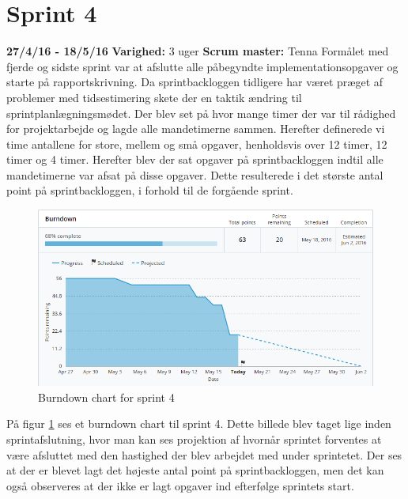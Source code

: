 	\section{Sprint 4}
	\textbf{27/4/16 - 18/5/16}\newline
	\textbf{Varighed: }3 uger \newline
	\textbf{Scrum master: }Tenna \newline \newline
	Formålet med fjerde og sidste sprint var at afslutte alle påbegyndte implementationsopgaver og starte på rapportskrivning. Da sprintbackloggen tidligere har været præget af problemer med tidsestimering skete der en taktik ændring til sprintplanlægningsmødet. Der blev set på hvor mange timer der var til rådighed for projektarbejde og lagde alle mandetimerne sammen. Herefter definerede vi time antallene for store, mellem og små opgaver, henholdsvis over 12 timer, 12 timer og 4 timer. Herefter blev der sat opgaver på sprintbackloggen indtil alle mandetimerne var afsat på disse opgaver. Dette resulterede i det største antal point på sprintbackloggen, i forhold til de forgående sprint.

	\begin{figure}[H]
		\centering
		\includegraphics[width=\textwidth]{Projektgennemfoerelse/images/burndown4}
		\caption{Burndown chart for sprint 4}
		\label{ref:Burndown4}
	\end{figure}
	
	På figur \ref{ref:Burndown4} ses et burndown chart til sprint 4. Dette billede blev taget lige inden sprintafslutning, hvor man kan ses projektion af hvornår sprintet forventes at være afsluttet med den hastighed der blev arbejdet med under sprintetet. Der ses at der er blevet lagt det højeste antal point på sprintbackloggen, men det kan også observeres at der ikke er lagt opgaver ind efterfølge sprintets start. \newline
	
